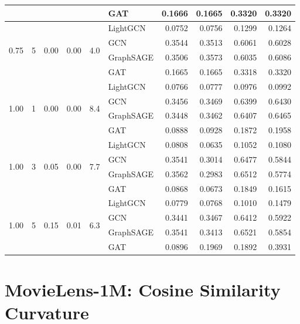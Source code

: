 {\begin{longtable}{cccccl rrrr}
 & & & & & GAT & 0.1666 & 0.1665 & 0.3320 & 0.3320 \\
\midrule
\multirow{4}{*}{0.75} & \multirow{4}{*}{5} & \multirow{4}{*}{0.00} & \multirow{4}{*}{0.00} & \multirow{4}{*}{4.0} & LightGCN & 0.0752 & 0.0756 & 0.1299 & 0.1264 \\
 & & & & & GCN & 0.3544 & 0.3513 & 0.6061 & 0.6028 \\
 & & & & & GraphSAGE & 0.3506 & 0.3573 & 0.6035 & 0.6086 \\
 & & & & & GAT & 0.1665 & 0.1665 & 0.3318 & 0.3320 \\
\midrule
\multirow{4}{*}{1.00} & \multirow{4}{*}{1} & \multirow{4}{*}{0.00} & \multirow{4}{*}{0.00} & \multirow{4}{*}{8.4} & LightGCN & 0.0766 & 0.0777 & 0.0976 & 0.0992 \\
 & & & & & GCN & 0.3456 & 0.3469 & 0.6399 & 0.6430 \\
 & & & & & GraphSAGE & 0.3448 & 0.3462 & 0.6407 & 0.6465 \\
 & & & & & GAT & 0.0888 & 0.0928 & 0.1872 & 0.1958 \\
\midrule
\multirow{4}{*}{1.00} & \multirow{4}{*}{3} & \multirow{4}{*}{0.05} & \multirow{4}{*}{0.00} & \multirow{4}{*}{7.7} & LightGCN & 0.0808 & 0.0635 & 0.1052 & 0.1080 \\
 & & & & & GCN & 0.3541 & 0.3014 & 0.6477 & 0.5844 \\
 & & & & & GraphSAGE & 0.3562 & 0.2983 & 0.6512 & 0.5774 \\
 & & & & & GAT & 0.0868 & 0.0673 & 0.1849 & 0.1615 \\
\midrule
\multirow{4}{*}{1.00} & \multirow{4}{*}{5} & \multirow{4}{*}{0.15} & \multirow{4}{*}{0.01} & \multirow{4}{*}{6.3} & LightGCN & 0.0779 & 0.0768 & 0.1010 & 0.1479 \\
 & & & & & GCN & 0.3441 & 0.3467 & 0.6412 & 0.5922 \\
 & & & & & GraphSAGE & 0.3541 & 0.3413 & 0.6521 & 0.5854 \\
 & & & & & GAT & 0.0896 & 0.1969 & 0.1892 & 0.3931 \\
\midrule
\end{longtable}
}

\section{MovieLens-1M: Cosine Similarity Curvature}

